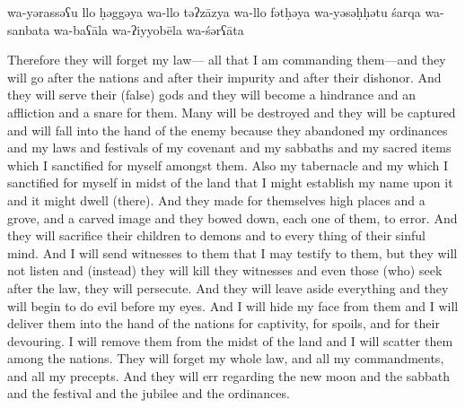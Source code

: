 \begin{transliteration}
    wa-yərassəʕu llo ḥəggəya
    wa-llo təʔzāzya wa-llo fətḥəya wa-yəsəḥḥətu śarqa wa-sanbata
    wa-baʕāla wa-ʔiyyobēla wa-śərʕāta
\end{transliteration}

\begin{translation}
    Therefore they will forget my law---%
    all that I am commanding them---and they will go after the nations and after
    their impurity and after their dishonor. And they will serve their (false) gods
    and they will become a hindrance and an affliction and a snare for them.
    Many will be destroyed and they will be captured and will fall into
    the hand of the enemy because they abandoned my ordinances and my laws and festivals of 
    my covenant and my sabbaths and my sacred items which I sanctified for myself amongst them.
    Also my tabernacle and my \temple which I sanctified for myself in midst of
    the land that I might establish my name upon it and it might dwell (there).
    And they made
    for themselves high places and a grove, and a carved image and they bowed down, each one of them,
    to error. And they will sacrifice their children to demons and to every thing
    of their sinful mind.
    And I will send witnesses to them that
    I may testify to them, but they will not listen and (instead) they will kill they witnesses and even
    those (who) seek after the law, they will persecute. And they will leave aside everything and they will begin to do
    evil before my eyes.
    And I will hide my face
    from them and I will deliver them into the hand of the nations for captivity,
    for spoils, and for their devouring. I will remove them from the midst of the land
    and I will scatter them among the nations.
    They will forget my whole law,
    and all my commandments, and all my precepts. And they will err regarding the new moon and the sabbath
    and the festival and the jubilee and the ordinances.
\end{translation}
